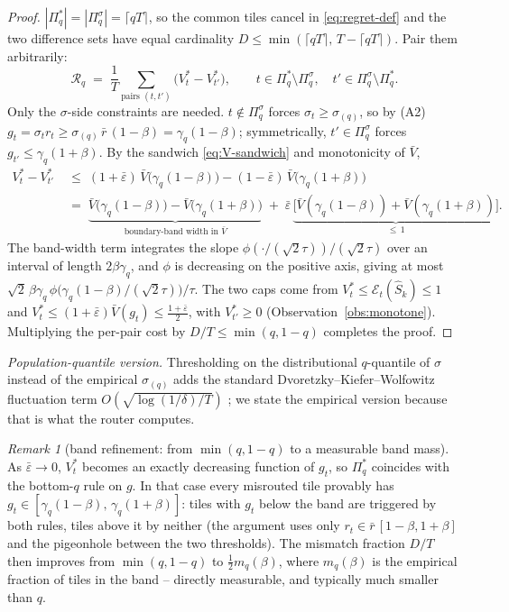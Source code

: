 \documentclass[11pt]{article}
\theoremstyle{remark}
\newtheorem{remark}{Remark}
\begin{document}
\begin{proof}
$|\Pi_q^*| = |\Pi_q^\sigma| = \lceil qT \rceil$, so the common tiles cancel in \eqref{eq:regret-def} and the two difference sets have equal cardinality $D \le \min(\lceil qT \rceil,\, T - \lceil qT \rceil)$. Pair them arbitrarily:
\[
\mathcal R_q \;=\; \frac1T \sum_{\text{pairs } (t, t')} \bigl( V^*_t - V^*_{t'} \bigr), \qquad t \in \Pi_q^* \setminus \Pi_q^\sigma,\quad t' \in \Pi_q^\sigma \setminus \Pi_q^*.
\]
Only the $\sigma$-side constraints are needed. $t \notin \Pi_q^\sigma$ forces $\sigma_t \ge \sigma_{(q)}$, so by (A2) $g_t = \sigma_t r_t \ge \sigma_{(q)}\, \bar r\, (1-\beta) = \gamma_q(1-\beta)$; symmetrically, $t' \in \Pi_q^\sigma$ forces $g_{t'} \le \gamma_q(1+\beta)$. By the sandwich \eqref{eq:V-sandwich} and monotonicity of $\bar V$,
\begin{align*}
V^*_t - V^*_{t'} \;&\le\; (1+\bar\varepsilon)\,\bar V\bigl(\gamma_q(1-\beta)\bigr) - (1-\bar\varepsilon)\,\bar V\bigl(\gamma_q(1+\beta)\bigr) \\
&=\; \underbrace{\bar V\bigl(\gamma_q(1-\beta)\bigr) - \bar V\bigl(\gamma_q(1+\beta)\bigr)}_{\text{boundary-band width in }\bar V}
\;+\; \bar\varepsilon\, \underbrace{\bigl[\bar V(\gamma_q(1-\beta)) + \bar V(\gamma_q(1+\beta))\bigr]}_{\le\, 1}.
\end{align*}
The band-width term integrates the slope $\phi(\cdot/(\sqrt2\tau))/(\sqrt2\tau)$ over an interval of length $2\beta\gamma_q$, and $\phi$ is decreasing on the positive axis, giving at most $\sqrt2\, \beta\gamma_q\, \phi\bigl(\gamma_q(1-\beta)/(\sqrt2\tau)\bigr)/\tau$. The two caps come from $V^*_t \le \mathcal E_t(\widehat S_k) \le 1$ and $V^*_t \le (1+\bar\varepsilon)\bar V(g_t) \le \tfrac{1+\bar\varepsilon}{2}$, with $V^*_{t'} \ge 0$ (Observation~\ref{obs:monotone}). Multiplying the per-pair cost by $D/T \le \min(q, 1-q)$ completes the proof.
\end{proof}

\emph{Population-quantile version.} Thresholding on the distributional $q$-quantile of $\sigma$ instead of the empirical $\sigma_{(q)}$ adds the standard Dvoretzky--Kiefer--Wolfowitz fluctuation term $O(\sqrt{\log(1/\delta)/T})$ \citep{dkw1956, massart1990}; we state the empirical version because that is what the router computes.

\begin{remark}[band refinement: from $\min(q,1-q)$ to a measurable band mass]\label{rem:band}
As $\bar\varepsilon \to 0$, $V^*_t$ becomes an exactly decreasing function of $g_t$, so $\Pi_q^*$ coincides with the bottom-$q$ rule on $g$. In that case every misrouted tile provably has $g_t \in [\gamma_q(1-\beta),\, \gamma_q(1+\beta)]$: tiles with $g_t$ below the band are triggered by both rules, tiles above it by neither (the argument uses only $r_t \in \bar r\,[1-\beta, 1+\beta]$ and the pigeonhole between the two thresholds). The mismatch fraction $D/T$ then improves from $\min(q, 1-q)$ to $\tfrac12 m_q(\beta)$, where $m_q(\beta)$ is the empirical fraction of tiles in the band -- directly measurable, and typically much smaller than $q$.
\end{remark}
\end{document}
